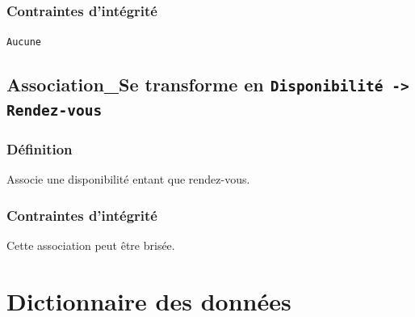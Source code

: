 \subsubsection{Contraintes d'intégrité}
\texttt{Aucune}

\subsection{Association\_Se transforme en \texttt{Disponibilité -> Rendez-vous}}
\subsubsection{Définition}
Associe une disponibilité entant que rendez-vous.
\subsubsection{Contraintes d'intégrité}
Cette association peut être brisée.
\newpage

\section{Dictionnaire des données}

